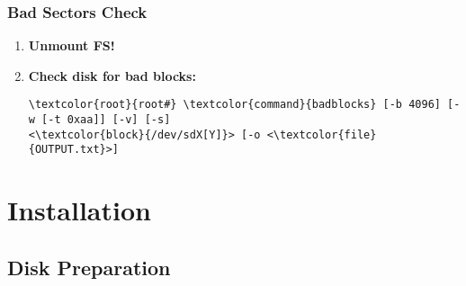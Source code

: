 \documentclass[10pt, a4paper, onecolumn, oneside, titlepage, openany]{book}
\begin{document}
\subsection{Bad Sectors Check}
\begin{enumerate}
    \item \textbf{Unmount FS!}
    \item \textbf{Check disk for bad blocks:}
\begin{Verbatim}[commandchars=\\\{\}]
\textcolor{root}{root#} \textcolor{command}{badblocks} [-b 4096] [-w [-t 0xaa]] [-v] [-s]
<\textcolor{block}{/dev/sdX[Y]}> [-o <\textcolor{file}{OUTPUT.txt}>]
\end{Verbatim}
\end{enumerate}



\chapter{Installation}
\section{Disk Preparation}
\end{document}

